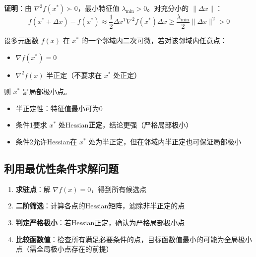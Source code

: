\textbf{证明}：由 $\nabla^2 f(x^*) \succ 0$，最小特征值 $\lambda_{\min} > 0$。对充分小的 $\|\Delta x\|$：
\[
f(x^* + \Delta x) - f(x^*) \approx \frac{1}{2} \Delta x^T \nabla^2 f(x^*) \Delta x \geq \frac{\lambda_{\min}}{2} \|\Delta x\|^2 > 0
\]

\begin{theorem}[二阶充分条件 2]\label{thm:second-order-sufficient2}
设多元函数 $f(x)$ 在 $x^*$ 的一个邻域内二次可微，若对该邻域内任意点：
\begin{itemize}
    \item $\nabla f(x^*) = 0$
    \item $\nabla^2 f(x)$ 半正定（不要求在 $x^*$ 处正定）
\end{itemize}
则 $x^*$ 是局部极小点。
\end{theorem}

\begin{notebox}[注意区别]
\begin{itemize}[itemsep=0.3em]
    \item 半正定性：特征值最小可为0
    \item 条件1要求 $x^*$ 处Hessian\textbf{正定}，结论更强（严格局部极小）
    \item 条件2允许Hessian在 $x^*$ 处为半正定，但在邻域内半正定也可保证局部极小
\end{itemize}
\end{notebox}

\subsection{利用最优性条件求解问题}

\begin{algobox}[求解步骤]
\begin{enumerate}[label=Step \arabic*:, leftmargin=2em]
    \item \textbf{求驻点}：解 $\nabla f(x) = 0$，得到所有候选点
    \item \textbf{二阶筛选}：计算各点的Hessian矩阵，滤除非半正定的点
    \item \textbf{判定严格极小}：若Hessian正定，确认为严格局部极小点
    \item \textbf{比较函数值}：检查所有满足必要条件的点，目标函数值最小的可能为全局极小点（需全局极小点存在的前提）
\end{enumerate}
\end{algobox}

